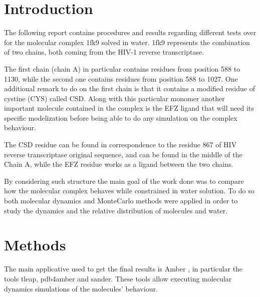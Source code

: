 \documentclass[12pt]{article}
\begin{document}
\section{Introduction}
The following report contains procedures and results regarding different tests over for the molecular complex 1fk9\cite{Ren2000} solved in water. 1fk9 represents the combination of two chains, both coming from the HIV-1 reverse transcriptase\cite{pmid3040055}.

The first chain (chain A) in particular contains residues from position 588 to 1130, while the second one contains residues from position 588 to 1027. One additional remark to do on the first chain is that it contains a modified residue of cystine (CYS) called CSD. Along with this particular monomer another important molecule contained in the complex is the EFZ ligand that will need its specific modelization before being able to do any simulation on the complex behaviour.

The CSD residue can be found in correspondence to the residue 867 of HIV reverse transcriptase original sequence, and can be found in the middle of the Chain A, while the EFZ residue works as a ligand between the two chains.

By considering such structure the main goal of the work done was to compare how the molecular complex behaves while constrained in water solution. To do so both molecular dynamics and MonteCarlo methods were applied in order to study the dynamics and the relative distribution of molecules and water.

\section{Methods}
The main applicative used to get the final results is Amber \cite{Amber}, in particular the tools tleap, pdb4amber and sander. These tools allow executing molecular dynamics simulations of the molecules' behaviour.
\end{document}
